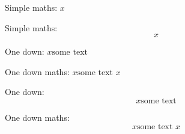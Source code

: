 \documentclass{article}
\begin{document}
Simple maths: $x$

Simple maths: $$x$$

One down: $x \text{some text}$

One down maths: $x \text{some text $x$}$

One down: $$x \text{some text}$$

One down maths: $$x \text{some text $x$}$$
\end{document}

